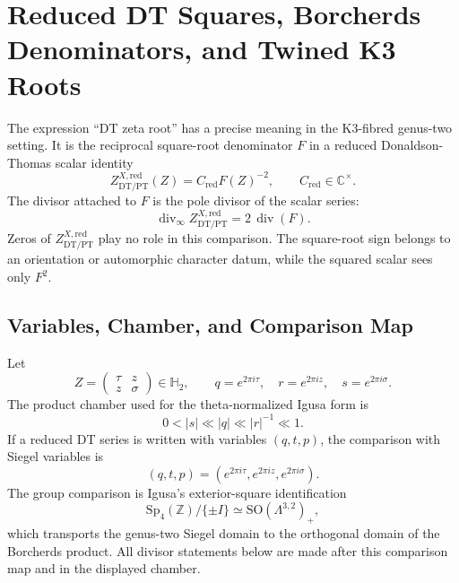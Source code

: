 \section{Reduced DT Squares, Borcherds Denominators, and Twined K3 Roots}
\label{sec:dt-zeta-roots-nekrasov}

\providecommand{\kBKM}{\kappa_{\mathrm{BKM}}}
\providecommand{\kch}{\kappa_{\mathrm{ch}}}
\providecommand{\kcat}{\kappa_{\mathrm{cat}}}
\providecommand{\kfib}{\kappa_{\mathrm{fiber}}}
\providecommand{\kHeis}{\kappa_{\mathrm{ch}}^{\mathrm{Heis}}}
\providecommand{\ZZ}{\mathbb{Z}}
\providecommand{\CC}{\mathbb{C}}
\providecommand{\HH}{\mathbb{H}}
\providecommand{\cO}{\mathcal{O}}
\providecommand{\Sp}{\mathrm{Sp}}
\providecommand{\SO}{\mathrm{SO}}
\providecommand{\DT}{\mathrm{DT}}
\providecommand{\PT}{\mathrm{PT}}
\providecommand{\GW}{\mathrm{GW}}
\providecommand{\CoHA}{\mathrm{CoHA}}
\providecommand{\Phiten}{\Phi_{10}}
\providecommand{\AAtwo}{\mathcal{A}_2}
\providecommand{\fg}{\mathfrak{g}}
\providecommand{\wt}{\operatorname{wt}}
\providecommand{\sdim}{\operatorname{sdim}}

The expression ``DT zeta root'' has a precise meaning in the
K3-fibred genus-two setting.  It is the reciprocal square-root
denominator \(F\) in a reduced Donaldson-Thomas scalar identity
\[
        Z^{X,\mathrm{red}}_{\DT/\PT}(Z)=C_{\mathrm{red}}F(Z)^{-2},
        \qquad C_{\mathrm{red}}\in\CC^\times .
\]
The divisor attached to \(F\) is the pole divisor of the scalar
series:
\[
        \operatorname{div}_{\infty}
        Z^{X,\mathrm{red}}_{\DT/\PT}
        =2\,\operatorname{div}(F).
\]
Zeros of \(Z^{X,\mathrm{red}}_{\DT/\PT}\) play no role in this
comparison.  The square-root sign belongs to an orientation or
automorphic character datum, while the squared scalar sees only
\(F^2\).

\subsection{Variables, Chamber, and Comparison Map}
\label{subsec:dt-square-normalisation}

Let
\[
        Z=\begin{pmatrix}\tau&z\\ z&\sigma\end{pmatrix}\in\HH_2,
        \qquad
        q=e^{2\pi i\tau},\quad r=e^{2\pi iz},\quad
        s=e^{2\pi i\sigma}.
\]
The product chamber used for the theta-normalized Igusa form is
\[
        0<|s|\ll |q|\ll |r|^{-1}\ll 1 .
\]
If a reduced DT series is written with variables \((q,t,p)\), the
comparison with Siegel variables is
\[
        (q,t,p)=(e^{2\pi i\tau},e^{2\pi iz},e^{2\pi i\sigma}).
\]
The group comparison is Igusa's exterior-square identification
\[
        \Sp_4(\ZZ)/\{\pm I\}\simeq \SO(\Lambda^{3,2})_+,
\]
which transports the genus-two Siegel domain to the orthogonal domain
of the Borcherds product.  All divisor statements below are made after
this comparison map and in the displayed chamber.

